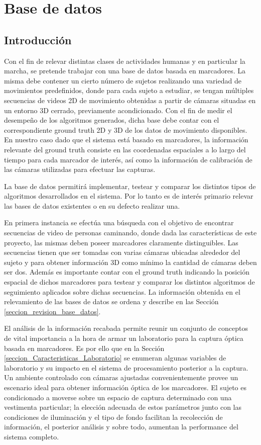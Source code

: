 \chapter{Base de datos} 
\label{section_base_de_datos}
\section{Introducción} 
Con el fin de relevar distintas clases de actividades humanas y en particular la marcha, se pretende trabajar con una base de datos basada en marcadores. La misma debe contener un cierto número de sujetos realizando una variedad de movimientos predefinidos, donde para cada sujeto a estudiar, se tengan múltiples secuencias de videos 2D de movimiento obtenidas a partir de cámaras situadas en un entorno 3D cerrado, previamente acondicionado. Con el fin de medir el desempeño de los algoritmos generados, dicha base debe contar con el correspondiente ground truth 2D y 3D de los datos de movimiento disponibles. En nuestro caso dado que el  sistema está basado en marcadores, la información relevante del ground truth consiste en las coordenadas espaciales a lo largo del tiempo para cada marcador de interés, así como la información de calibración de las cámaras utilizadas para efectuar las capturas.


La base de datos permitirá implementar, testear y comparar los distintos tipos de algoritmos desarrollados en el sistema. Por lo tanto es de interés primario relevar las bases de datos existentes o en su defecto realizar una.


En primera instancia se efectúa una búsqueda con el objetivo de encontrar secuencias de video de personas caminando, donde dada las características de este proyecto, las mismas deben poseer marcadores claramente distinguibles. Las secuencias tienen que ser tomadas con varias cámaras ubicadas alrededor del sujeto y para obtener información 3D como mínimo la cantidad de cámaras deben ser dos. Además es importante contar con el ground truth indicando la posición espacial de dichos marcadores para testear y comparar los distintos algoritmos de seguimiento aplicados sobre dichas secuencias. La información obtenida en el relevamiento de las bases de datos se ordena y describe en las Sección \ref{seccion_revision_base_datos}.


El análisis de la información recabada permite reunir un conjunto de conceptos de vital importancia a la hora de armar un laboratorio para la captura óptica basada en marcadores. Es por ello que en la Sección \ref{seccion_Caracteristicas_Laboratorio} se enumeran algunas variables de laboratorio y su impacto en el sistema de procesamiento posterior a la captura. Un ambiente controlado con cámaras ajustadas convenientemente provee un escenario ideal para obtener información óptica de los marcadores. El sujeto es condicionado a moverse sobre un espacio de captura determinado con una vestimenta particular; la elección adecuada de estos parámetros junto con las condiciones de iluminación y el tipo de fondo facilitan la recolección de información, el posterior análisis y sobre todo, aumentan la performance del sistema completo.




